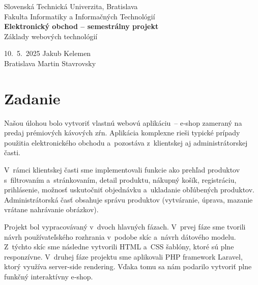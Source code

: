 \documentclass[12pt, a4paper]{article}
\begin{document}
\begin{titlepage}
  \centering
  \vspace*{1cm}
  {\large Slovenská Technická Univerzita, Bratislava\\}
  {\large Fakulta Informatiky a Informačných Technológií\\}
  \vfill
  {\LARGE\bfseries Elektronický obchod -- semestrálny projekt\\}
  \vspace{0.5em}
  {\large Základy webových technológií\\}
  \vfill
  \begin{flushleft}
    10.~5.~2025 \hfill Jakub Kelemen\\
    Bratislava    \hfill Martin Stavrovsky
  \end{flushleft}
\end{titlepage}

\tableofcontents
\newpage

\section{Zadanie}

Našou úlohou bolo vytvoriť vlastnú webovú aplikáciu~-- e‑shop zameraný na predaj prémiových kávových zŕn. Aplikácia komplexne rieši typické prípady použitia elektronického obchodu a~pozostáva z~klientskej aj administrátorskej časti.

V~rámci klientskej časti sme implementovali funkcie ako prehľad produktov s~filtrovaním a~stránkovaním, detail produktu, nákupný košík, registráciu, prihlásenie, možnosť uskutočniť objednávku a~ukladanie obľúbených produktov. Administrátorská časť obsahuje správu produktov (vytváranie, úprava, mazanie vrátane nahrávanie obrázkov).

Projekt bol vypracovávaný v~dvoch hlavných fázach. V~prvej fáze sme tvorili návrh používateľského rozhrania v~podobe skíc a~návrh dátového modelu. Z~týchto skíc sme následne vytvorili HTML a~CSS šablóny, ktoré sú plne responzívne. V~druhej fáze projektu sme aplikovali PHP framework Laravel, ktorý využíva server-side rendering. Vďaka tomu sa nám podarilo vytvoriť plne funkčný interaktívny e‑shop.

\end{document}
